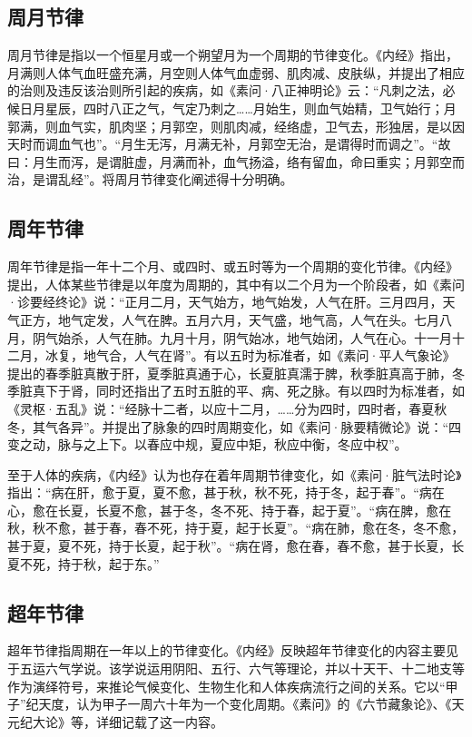 \documentclass[draft,12pt]{ctexbook}
\begin{document}
\subsection{周月节律}%

周月节律是指以一个恒星月或一个朔望月为一个周期的节律变化。《内经》指出，月满则人体气血旺盛充满，月空则人体气血虚弱、肌肉减、皮肤纵，并提出了相应的治则及违反该治则所引起的疾病，如《素问·八正神明论》云：“凡刺之法，必候日月星辰，四时八正之气，气定乃刺之……月始生，则血气始精，卫气始行；月郭满，则血气实，肌肉坚；月郭空，则肌肉减，经络虚，卫气去，形独居，是以因天时而调血气也”。“月生无泻，月满无补，月郭空无治，是谓得时而调之”。“故曰：月生而泻，是谓脏虚，月满而补，血气扬溢，络有留血，命曰重实；月郭空而治，是谓乱经”。将周月节律变化阐述得十分明确。

\subsection{周年节律}%

周年节律是指一年十二个月、或四时、或五时等为一个周期的变化节律。《内经》提出，人体某些节律是以年度为周期的，其中有以二个月为一个阶段者，如《素问·诊要经终论》说：“正月二月，天气始方，地气始发，人气在肝。三月四月，天气正方，地气定发，人气在脾。五月六月，天气盛，地气高，人气在头。七月八月，阴气始杀，人气在肺。九月十月，阴气始冰，地气始闭，人气在心。十一月十二月，冰复，地气合，人气在肾”。有以五时为标准者，如《素问·平人气象论》提出的春季脏真散于肝，夏季脏真通于心，长夏脏真濡于脾，秋季脏真高于肺，冬季脏真下于肾，同时还指出了五时五脏的平、病、死之脉。有以四时为标准者，如《灵枢·五乱》说：“经脉十二者，以应十二月，……分为四时，四时者，春夏秋冬，其气各异”。并提出了脉象的四时周期变化，如《素问·脉要精微论》说：“四变之动，脉与之上下。以春应中规，夏应中矩，秋应中衡，冬应中权”。

至于人体的疾病，《内经》认为也存在着年周期节律变化，如《素问·脏气法时论》指出：“病在肝，愈于夏，夏不愈，甚于秋，秋不死，持于冬，起于春”。“病在心，愈在长夏，长夏不愈，甚于冬，冬不死、持于春，起于夏”。“病在脾，愈在秋，秋不愈，甚于春，春不死，持于夏，起于长夏”。“病在肺，愈在冬，冬不愈，甚于夏，夏不死，持于长夏，起于秋”。“病在肾，愈在春，春不愈，甚于长夏，长夏不死，持于秋，起于东。”

\subsection{超年节律}%

超年节律指周期在一年以上的节律变化。《内经》反映超年节律变化的内容主要见于五运六气学说。该学说运用阴阳、五行、六气等理论，并以十天干、十二地支等作为演绎符号，来推论气候变化、生物生化和人体疾病流行之间的关系。它以“甲子”纪天度，认为甲子一周六十年为一个变化周期。《素问》的《六节藏象论》、《天元纪大论》等，详细记载了这一内容。
\end{document}
